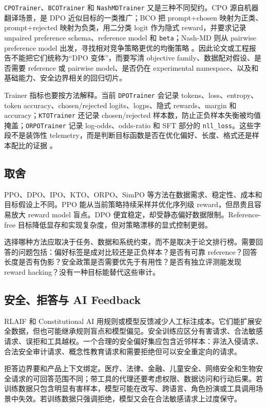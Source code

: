 \documentclass[UTF8,zihao=-4,openany]{ctexbook}
\begin{document}
\texttt{CPOTrainer}、\texttt{BCOTrainer} 和 \texttt{NashMDTrainer} 又是三种不同契约。CPO 源自机器翻译场景，是 DPO 近似目标的一类推广；BCO 把 prompt+chosen 映射为正类、prompt+rejected 映射为负类，用二分类 logit 作为隐式 reward，并要求记录 unpaired preference schema、reference model 和 \texttt{beta}；Nash-MD 则从 pairwise preference model 出发，寻找相对竞争策略更优的均衡策略 \cite{huggingface2026trlcpotrainer,huggingface2026trlbcotrainer,huggingface2026trlnashmdtrainer}。因此论文或工程报告不能把它们统称为“DPO 变体”，而要写清 objective family、数据配对假设、是否需要 reference 或 pairwise model、是否仍在 experimental namespace、以及和基础能力、安全边界相关的回归切片。

Trainer 指标也要按方法解释。当前 \texttt{DPOTrainer} 会记录 tokens、loss、entropy、token accuracy、chosen/rejected logits、logps、隐式 rewards、margin 和 accuracy；\texttt{KTOTrainer} 还记录 chosen/rejected 样本数，防止正负样本失衡被均值掩盖；\texttt{ORPOTrainer} 记录 log-odds、odds-ratio 和 SFT 部分的 \texttt{nll\_loss}。这些字段不是装饰性 telemetry，而是判断目标函数是否在优化偏好、长度、格式还是样本配比的证据 \cite{huggingface2026trldpotrainer,huggingface2026trlktotrainer,huggingface2026trlorpotrainer}。

\subsection{取舍}
PPO、DPO、IPO、KTO、ORPO、SimPO 等方法在数据需求、稳定性、成本和目标假设上不同。PPO 能从当前策略持续采样并优化序列级 reward，但昂贵且容易放大 reward model 盲点。DPO 便宜稳定，却受静态偏好数据限制。Reference-free 目标降低显存和实现复杂度，但对策略漂移的显式控制更弱。

选择哪种方法应取决于任务、数据和系统约束，而不是取决于论文排行榜。需要回答的问题包括：偏好标签是成对比较还是正负样本？是否有可靠 reference？回答长度是否有伪影？安全政策是否需要优先于有用性？是否有独立评测能发现 reward hacking？没有一种目标能替代这些审计。

\subsection{安全、拒答与 AI Feedback}
RLAIF 和 Constitutional AI 用规则或模型反馈减少人工标注成本。它们能扩展安全数据，但也可能继承规则盲点和模型偏见。安全训练应区分有害请求、合法敏感请求、误拒和工具越权。一个合理的安全偏好集应包含近邻样本：非法入侵请求、合法安全审计请求、概念性教育请求和需要拒绝但可以安全重定向的请求。

拒答边界要和产品上下文绑定。医疗、法律、金融、儿童安全、网络安全和生物安全请求的可回答范围不同；带工具的代理还要考虑权限、数据访问和行动后果。若训练数据只包含明显有害样本，模型可能在改写、跨语言、角色扮演或工具调用场景中失效。若训练数据只强调拒绝，模型又会在合法敏感请求上过度保守。
\end{document}
